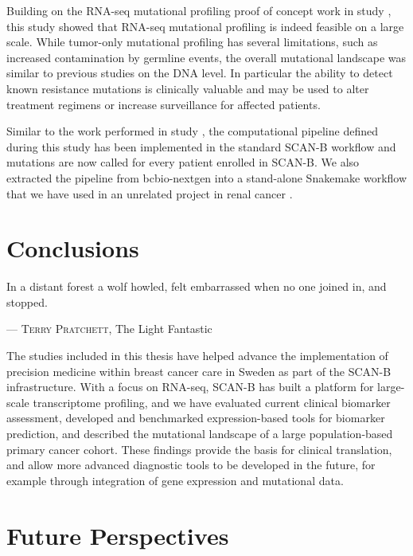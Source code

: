 \documentclass[11pt]{book}
\newcommand{\scanb}{\mbox{SCAN-B}}
\begin{document}
Building on the RNA-seq mutational profiling proof of concept work in study \I, this study showed that RNA-seq mutational profiling is indeed feasible on a large scale. While tumor-only mutational profiling has several limitations, such as increased contamination by germline events, the overall mutational landscape was similar to previous studies on the DNA level. In particular the ability to detect known resistance mutations is clinically valuable and may be used to alter treatment regimens or increase surveillance for affected patients.

Similar to the work performed in study \III, the computational pipeline defined during this study has been implemented in the standard \scanb{} workflow and mutations are now called for every patient enrolled in \scanb{}. We also extracted the pipeline from bcbio-nextgen into a stand-alone Snakemake \cite{Koster:2012} workflow that we have used in an unrelated project in renal cancer \cite{Nilsson:2020}.


\chapter{Conclusions}

\epigraph{In a distant forest a wolf howled, felt embarrassed when no one joined in, and stopped.}{--- \textsc{Terry Pratchett}\small\textnormal{, The Light Fantastic}}

The studies included in this thesis have helped advance the implementation of precision medicine within breast cancer care in Sweden as part of the \scanb{} infrastructure. With a focus on RNA-seq, \scanb{} has built a platform for large-scale transcriptome profiling, and we have evaluated current clinical biomarker assessment, developed and benchmarked expression-based tools for biomarker prediction, and described the mutational landscape of a large population-based primary cancer cohort. These findings provide the basis for clinical translation, and allow more advanced diagnostic tools to be developed in the future, for example through integration of gene expression and mutational data.


\chapter{Future Perspectives}
\end{document}
